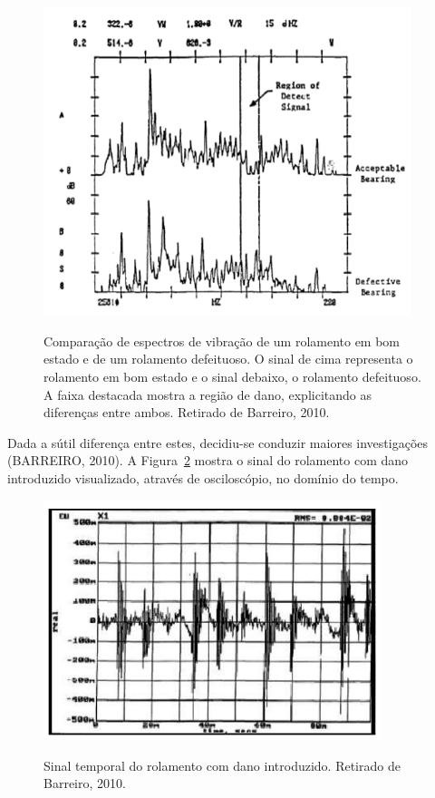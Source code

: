 \documentclass[
	12pt,				
	oneside,			
	a4paper,			
	english,			
	brazil,			
	]{abntex2ppgsi}
\begin{document}
\begin{figure}[H]
\centering
\caption {Comparação de espectros de vibração de um rolamento em bom estado e de um rolamento defeituoso. O sinal de cima representa o rolamento em bom estado e o sinal debaixo, o rolamento defeituoso. A faixa destacada mostra a região de dano, explicitando as diferenças entre ambos. Retirado de Barreiro, 2010.}
\includegraphics[width=\textwidth,height=90mm,keepaspectratio]{fft_sinal_barreiro}
\label{fft_sinal_barreiro}
\end{figure}

Dada a sútil diferença entre estes, decidiu-se conduzir maiores investigações (BARREIRO, 2010). A Figura~\ref{sinal_temporal_rolamento_barreiro} mostra o sinal do rolamento com dano introduzido visualizado, através de osciloscópio, no domínio do tempo.

\begin{figure}[H]
\centering
\caption {Sinal temporal do rolamento com dano introduzido. Retirado de Barreiro, 2010.}
\includegraphics[width=\textwidth,height=70mm,keepaspectratio]{sinal_temporal_rolamento_barreiro}
\label{sinal_temporal_rolamento_barreiro}
\end{figure}
\end{document}
